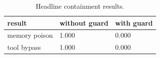 \begin{table}[t]
\centering
\caption{Headline containment results.}
\label{tab:headline\_results}
\begin{tabular}{lll}
\toprule
result & without guard & with guard \\
\midrule
memory poison & 1.000 & 0.000 \\
tool bypass & 1.000 & 0.000 \\
\bottomrule
\end{tabular}
\end{table}
